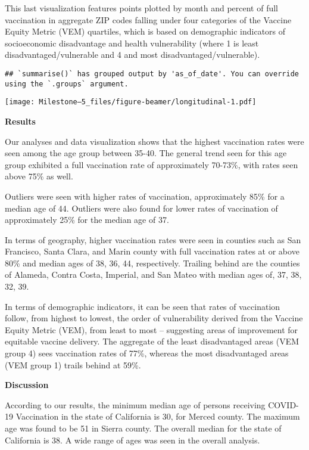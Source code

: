 \documentclass[
  ignorenonframetext,
]{beamer}
\begin{document}
\begin{frame}[fragile]
This last visualization features points plotted by month and percent of
full vaccination in aggregate ZIP codes falling under four categories of
the Vaccine Equity Metric (VEM) quartiles, which is based on demographic
indicators of socioeconomic disadvantage and health vulnerability (where
1 is least disadvantaged/vulnerable and 4 and most
disadvantaged/vulnerable).

\begin{verbatim}
## `summarise()` has grouped output by 'as_of_date'. You can override using the `.groups` argument.
\end{verbatim}

\texttt{[image: Milestone--5\_files/figure-beamer/longitudinal-1.pdf]}


\end{frame}

\begin{frame}
\textbf{Results}

Our analyses and data visualization shows that the highest vaccination
rates were seen among the age group between 35-40. The general trend
seen for this age group exhibited a full vaccination rate of
approximately 70-73\%, with rates seen above 75\% as well.

Outliers were seen with higher rates of vaccination, approximately 85\%
for a median age of 44. Outliers were also found for lower rates of
vaccination of approximately 25\% for the median age of 37.

In terms of geography, higher vaccination rates were seen in counties
such as San Francisco, Santa Clara, and Marin county with full
vaccination rates at or above 80\% and median ages of 38, 36, 44,
respectively. Trailing behind are the counties of Alameda, Contra Costa,
Imperial, and San Mateo with median ages of, 37, 38, 32, 39.

In terms of demographic indicators, it can be seen that rates of
vaccination follow, from highest to lowest, the order of vulnerability
derived from the Vaccine Equity Metric (VEM), from least to most --
suggesting areas of improvement for equitable vaccine delivery. The
aggregate of the least disadvantaged areas (VEM group 4) sees
vaccination rates of 77\%, whereas the most disadvantaged areas (VEM
group 1) trails behind at 59\%.
\end{frame}

\begin{frame}
\textbf{Discussion}

According to our results, the minimum median age of persons receiving
COVID-19 Vaccination in the state of California is 30, for Merced
county. The maximum age was found to be 51 in Sierra county. The overall
median for the state of California is 38. A wide range of ages was seen
in the overall analysis.
\end{frame}
\end{document}
